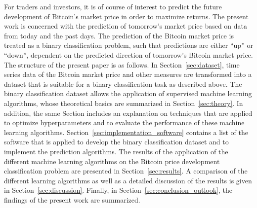 For traders and investors, it is of course of interest to predict the future development of Bitcoin's market price in order to maximize returns. The present work is concerned with the prediction of tomorrow's market price based on data from today and the past days. The prediction of the Bitcoin market price is treated as a binary classification problem, such that predictions are either \enquote{up} or \enquote{down}, dependent on the predicted direction of tomorrow's Bitcoin market price.\\

The structure of the present paper is as follows. In Section~\ref{sec:dataset}, time series data of the Bitcoin market price and other measures are transformed into a dataset that is suitable for a binary classification task as described above. The binary classification dataset allows the application of supervised machine learning algorithms, whose theoretical basics are summarized in Section~\ref{sec:theory}. In addition, the same Section includes an explanation on techniques that are applied to optimize hyperparameters and to evaluate the performance of these machine learning algorithms. Section~\ref{sec:implementation_software} contains a list of the software that is applied to develop the binary classification dataset and to implement the prediction algorithms. The results of the application of the different machine learning algorithms on the Bitcoin price development classification problem are presented in Section~\ref{sec:results}. A comparison of the different learning algorithms as well as a detailed discussion of the results is given in Section~\ref{sec:discussion}. Finally, in Section~\ref{sec:conclusion_outlook}, the findings of the present work are summarized.